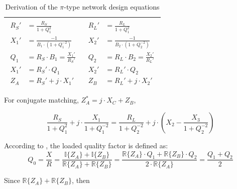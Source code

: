 \begin{table}[H]
\begin{tabular}{ | c | c | }
    \begin{minipage}{.4\textwidth}
         {\begin{align}
           R_S' &= \frac{R_S}{1 + Q_1^2}\\
           X_1' &= \frac{-1}{B_1 \cdot (1 + Q_1^{-2})} \\
           Q_1 &= R_S \cdot B_1 = \frac{X_1'}{R_S'}\\
           X_1' &= R_S' \cdot Q_1\\
           Z_A &= R_S' + j\cdot X_1'
         \end{align}}
    \end{minipage}
    &
        \begin{minipage}{.4\textwidth}
         {\begin{align}
           R_L' &= \frac{R_L}{1 + Q_1^2}\\
           X_2' &= \frac{-1}{B_2 \cdot (1 + Q_2  ^{-2})} \\
           Q_2 &= R_L \cdot B_2 = \frac{X_2'}{R_L'}\\
           X_2' &= R_L' \cdot Q_2\\
           Z_B &= R_L' + j\cdot X_2'
         \end{align}}
    \end{minipage}
    \\ \hline
  \end{tabular}
  \caption{Derivation of the $\pi$-type network design equations}
  \label{tbl:pi-eqs}
\end{table}

\noindent For conjugate matching, $Z_A^* = j·X_C + Z_B$,

\begin{equation}
\frac{R_S}{1 + Q_1^2} + j \cdot \frac{X_1}{1 + Q_1^{-2}} = \frac{R_L}{1 + Q_2^{-2}} + j \cdot \left( X_2 - \frac{X_3}{1 + Q_2^{-2}} \right)
\end{equation}

\noindent According to \cite{YSunMatching}, the loaded quality factor is defined as:
\begin{equation}
Q_0 = \frac{X}{R} = \frac{\mathbb{I} \lbrace Z_A \rbrace + \mathbb{I} \lbrace Z_B \rbrace}{\mathbb{R} \lbrace Z_A \rbrace + \mathbb{R} \lbrace Z_B \rbrace} = \frac{\mathbb{R} \lbrace Z_A\rbrace \cdot Q_1 + \mathbb{R} \lbrace Z_B\rbrace \cdot Q_2}{2 \cdot \mathbb{R} \lbrace Z_A\rbrace} = \frac{Q_1 + Q_2}{2}
\label{eq:PiMatchingQ}
\end{equation}

\noindent Since $\mathbb{R} \lbrace Z_A \rbrace + \mathbb{R} \lbrace Z_B \rbrace$, then

